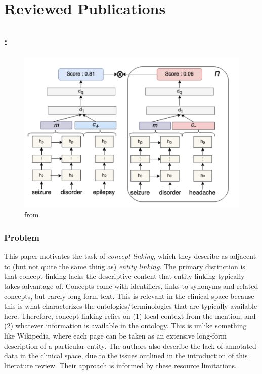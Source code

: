 \documentclass{article}
\begin{document}
\section{Reviewed Publications}

\subsection{\cite{schumacher_clinical_2020}: }

\begin{figure}
\centering
\includegraphics[scale=0.5]{clinical-concept-linking-fig-1}
\caption{from \cite{schumacher_clinical_2020}}
\label{fig:concept-linker}
\end{figure}

\subsubsection{Problem}

This paper motivates the task of \emph{concept linking}, which they describe as adjacent to (but not quite the same thing as) \emph{entity linking}. The primary distinction is that concept linking lacks the descriptive content that entity linking typically takes advantage of. Concepts come with identifiers, links to synonyms and related concepts, but rarely long-form text. This is relevant in the clinical space because this is what characterizes the ontologies/terminologies that are typically available here. Therefore, concept linking relies on (1) local context from the mention, and (2) whatever information is available in the ontology. This is unlike something like Wikipedia, where each page can be taken as an extensive long-form description of a particular entity. The authors also describe the lack of annotated data in the clinical space, due to the issues outlined in the introduction of this literature review. Their approach is informed by these resource limitations.
\end{document}
